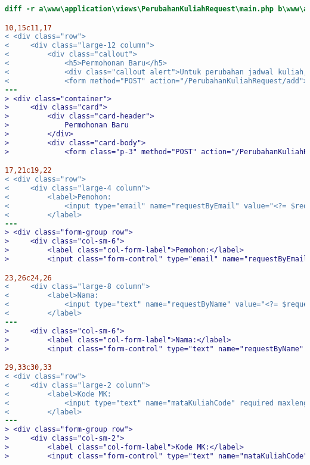 \begin{lstlisting}[language=diff, caption=Perubahan file \path{\views\PerubahanKuliahRequest\main.php} ,  basicstyle=\ttfamily, frame=single,
columns=fullflexible, keepspaces=true, breaklines=true, label={lst:mainPerubahanKuliahRequest}]
diff -r a\www\application\views\PerubahanKuliahRequest\main.php b\www\application\views\PerubahanKuliahRequest\main.php

10,15c11,17
< <div class="row">
<     <div class="large-12 column">
<         <div class="callout">
<             <h5>Permohonan Baru</h5>
<             <div class="callout alert">Untuk perubahan jadwal kuliah, silakan berkoordinasi langsung dengan peserta kuliah.</div>                    
<             <form method="POST" action="/PerubahanKuliahRequest/add">
---
> <div class="container">
>     <div class="card">
>         <div class="card-header">
>             Permohonan Baru
>         </div>
>         <div class="card-body">
>             <form class="p-3" method="POST" action="/PerubahanKuliahRequest/add">

17,21c19,22
< <div class="row">
<     <div class="large-4 column">
<         <label>Pemohon:
<             <input type="email" name="requestByEmail" value="<?= $requestByEmail ?>" readonly="readonly"/>
<         </label>
---
> <div class="form-group row">
>     <div class="col-sm-6">
>         <label class="col-form-label">Pemohon:</label>
>         <input class="form-control" type="email" name="requestByEmail" value="<?= $requestByEmail ?>" readonly/>

23,26c24,26
<     <div class="large-8 column">
<         <label>Nama:
<             <input type="text" name="requestByName" value="<?= $requestByName ?>" readonly="readonly"/>
<         </label>
---
>     <div class="col-sm-6">
>         <label class="col-form-label">Nama:</label>
>         <input class="form-control" type="text" name="requestByName" value="<?= $requestByName ?>" readonly="readonly"/>

29,33c30,33
< <div class="row">
<     <div class="large-2 column">
<         <label>Kode MK:
<             <input type="text" name="mataKuliahCode" required maxlength="9" pattern="[A-Z]{3}[0-9]{3}([0-9]{3})?" title="Kode MK dalam format XYZ123"/>
<         </label>
---
> <div class="form-group row">
>     <div class="col-sm-2">
>         <label class="col-form-label">Kode MK:</label>
>         <input class="form-control" type="text" name="mataKuliahCode" required maxlength="9" pattern="[A-Z]{3}[0-9]{3}([0-9]{3})?" title="Kode MK dalam format XYZ123"/>


\end{lstlisting}
